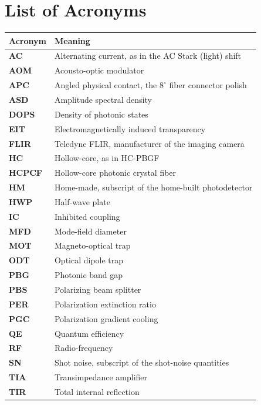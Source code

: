 \section*{List of Acronyms}

\begin{center}
\renewcommand{\arraystretch}{1.15}
\begin{tabular}{@{}>{\bfseries}l l@{}}
\toprule
\textnormal{Acronym} & Meaning \\
\midrule
AC    & Alternating current, as in the AC Stark (light) shift \\
AOM   & Acousto-optic modulator \\
APC   & Angled physical contact, the $8^\circ$ fiber connector polish \\
ASD   & Amplitude spectral density \\
DOPS  & Density of photonic states \\
EIT   & Electromagnetically induced transparency \\
FLIR  & Teledyne FLIR, manufacturer of the imaging camera \\
HC    & Hollow-core, as in HC-PBGF \\
HCPCF & Hollow-core photonic crystal fiber \\
HM    & Home-made, subscript of the home-built photodetector \\
HWP   & Half-wave plate \\
IC    & Inhibited coupling \\
MFD   & Mode-field diameter \\
MOT   & Magneto-optical trap \\
ODT   & Optical dipole trap \\
PBG   & Photonic band gap \\
PBS   & Polarizing beam splitter \\
PER   & Polarization extinction ratio \\
PGC   & Polarization gradient cooling \\
QE    & Quantum efficiency \\
RF    & Radio-frequency \\
SN    & Shot noise, subscript of the shot-noise quantities \\
TIA   & Transimpedance amplifier \\
TIR   & Total internal reflection \\
\bottomrule
\end{tabular}
\end{center}
